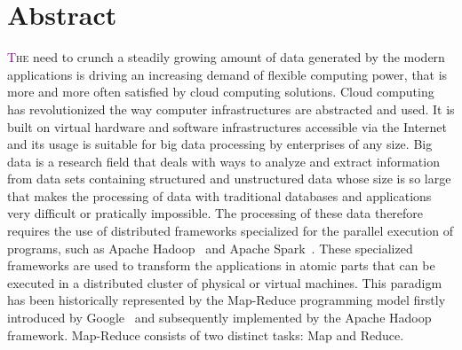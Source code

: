 
\begingroup
\let\clearpage\relax
\let\cleardoublepage\relax
\let\cleardoublepage\relax

\chapter*{Abstract}
\lettrine[lines=4]{\textcolor{purple}{T}}{he} need to crunch a steadily growing amount of data generated by the modern applications is driving an increasing demand of flexible computing power, that is more and more often satisfied by cloud computing solutions. Cloud computing has revolutionized the way computer infrastructures are abstracted and used. It is built on virtual hardware and software infrastructures accessible via the Internet and its usage is suitable for big data processing by enterprises of any size. 
Big data is a research field that deals with ways to analyze and extract information from data sets containing structured and unstructured data whose size is so large that makes the processing of data with traditional databases and applications very difficult or pratically impossible. The processing of these data therefore requires the use of distributed frameworks specialized for the parallel execution of programs, such as Apache Hadoop~\cite{misc:ApacheHadoop} and Apache Spark~\cite{misc:ApacheSpark}. These specialized frameworks are used to transform the applications in atomic parts that can be executed in a distributed cluster of physical or virtual machines. 
This paradigm has been historically represented by the Map-Reduce programming model firstly introduced by Google~\cite{misc:GoogleMapReduce} and subsequently implemented by the Apache Hadoop~\cite{misc:ApacheHadoop} framework. Map-Reduce consists of two distinct tasks: Map and Reduce. %
